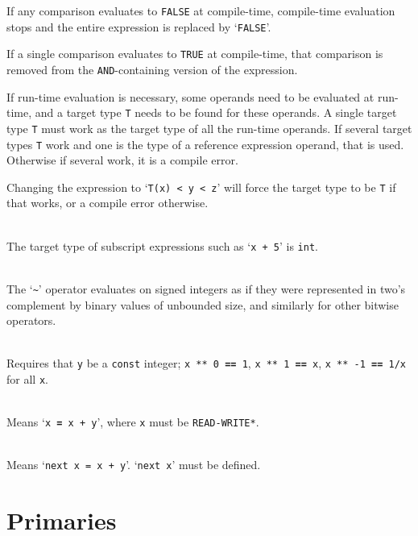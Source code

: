 \documentclass[12pt]{article}
\newcommand{\TT}[1]{{\tt \bfseries #1}}
\newenvironment{indpar}[1][0.3in]%
	{\begin{list}{}%
		     {\setlength{\itemsep}{0in}%
		      \setlength{\topsep}{0in}%
		      \setlength{\parsep}{1ex}%
		      \setlength{\labelwidth}{#1}%
		      \setlength{\leftmargin}{#1}%
		      \addtolength{\leftmargin}{\labelsep}}%
	 \item}%
	{\end{list}}
\begin{document}
\begin{indpar}
      If any comparison evaluates to {\tt FALSE} at compile-time,
      compile-time evaluation stops and the entire expression is replaced by
      `{\tt FALSE}'.

      If a single comparison evaluates to {\tt TRUE} at compile-time,
      that comparison is removed from the {\tt AND}-containing version
      of the expression.

      If run-time evaluation is necessary,
      some operands need to be evaluated
      at run-time, and a target type {\tt T} needs to be found for
      these operands.
      A single target type {\tt T} must work as the target type of all
      the run-time operands.  If several target types {\tt T} work and
      one is the type of a reference expression operand, that is used.
      Otherwise if several work, it is a compile error.

      Changing the expression to `{\tt T(x) < y < z}' will force
      the target type to be {\tt T} if that works, or a compile
      error otherwise.

\hspace*{-0.2in}{\tt v[x+5] \TT{=} y} \\
      The target type of subscript expressions such as `{\tt x + 5}'
      is {\tt int}.

\hspace*{-0.2in}{\tt \TT{\textasciitilde} x} \\
       The `{\tt \textasciitilde}' operator
       evaluates on signed integers as if they were represented
       in two's complement by binary values of unbounded size,
       and similarly for other bitwise operators.

\hspace*{-0.2in}{\tt x \TT{**} y} \\
       Requires that {\tt y} be a {\tt const} integer;
       {\tt x ** 0 \TT{==} 1}, {\tt x ** 1 \TT{==} x},
       {\tt x ** -1 \TT{==} 1/x} for all {\tt x}.

\hspace*{-0.2in}{\tt x \TT{+=} y} \\
	Means `{\tt x \TT{=} x + y}', where {\tt x} must be {\tt *READ-WRITE*}.

\hspace*{-0.2in}{\tt next x \TT{+=} y} \\
	Means `{\tt next x = x + y}'.  `{\tt next x}' must be defined.
\end{indpar}

\section{Primaries}
\label{PRIMARIES}
\end{document}
